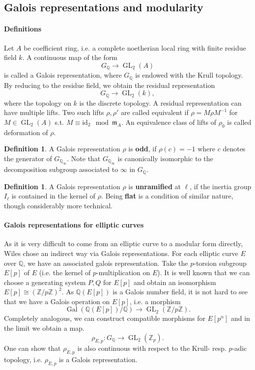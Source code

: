 \documentclass{article}
\theoremstyle{plain}%
\theoremstyle{definition}
\newtheorem{definition}[theorem]{Definition}
\theoremstyle{remark}
\newcommand{\GL}{\operatorname{GL}}
\begin{document}
\subsection{Galois representations and modularity}

\paragraph{Definitions}
Let \(A\) be coefficient ring, i.e. a complete noetherian local ring with finite residue field \(k\).
A continuous map of the form
\[
    G_\mathbb{Q} \to \GL_2(A)
\]
is called a Galois representation, where \(G_\mathbb{Q}\) is endowed with the Krull topology.
By reducing to the residue field, we obtain the residual representation
\[
    G_\mathbb{Q} \to \GL_2(k),
\]
where the topology on \(k\) is the discrete topology.
A residual representation can have multiple lifts. Two such lifts \(\rho, \rho'\) are called equivalent
if \(\rho = M\rho M^{-1}\) for \(M \in \GL_2(A)\) s.t. \(M \equiv \mathrm{id}_{2} \mod \mathfrak{m}_A\).
An equivalence class of lifts of \(\rho_0\) is called deformation of \(\rho\).

\begin{definition}
    A Galois representation \(\rho\) is \textbf{odd}, if \(\rho(c) = -1\) where \(c\) denotes the generator
    of \(G_{\mathbb{Q}_\infty}\). Note that \(G_{\mathbb{Q}_\infty}\) is canonically isomorphic to
    the decomposition subgroup associated to \(\infty\) in \(G_\mathbb{Q}\).
\end{definition}
\begin{definition}
    A Galois representation \(\rho\) is \textbf{unramified} at \(\ell\), if the inertia group
    \(I_\ell\) is contained in the kernel of \(\rho\).
    Being \textbf{flat} is a condition of similar nature, though considerably more technical.
\end{definition}

\paragraph{Galois representations for elliptic curves}
As it is very difficult to come from an elliptic curve to a modular form directly, 
Wiles chose an indirect way via Galois representations.
For each elliptic curve \(E\) over \(\mathbb{Q}\), we have an associated galois representation.
Take the \(p\)-torsion subgroup \(E[p]\) of \(E\) (i.e. the kernel of \(p\)-multiplication on \(E\)).
It is well known that we can choose a generating system \(P, Q\) for \(E[p]\) and 
obtain an isomorphism \(E[p] \cong (\mathbb{Z}/p \mathbb{Z})^2\).
As \(\mathbb{Q}(E[p])\) is a Galois number field, it is not hard to see that we have
a Galois operation on \(E[p]\), i.e. a morphism
\[
    \operatorname{Gal}(\mathbb{Q}(E[p])/\mathbb{Q}) \to \GL_2(\mathbb{Z}/p\mathbb{Z}).  
\]
Completely analogous, we can construct compatible morphisms for \(E[p^n]\) 
and in the limit we obtain a map.
\[
    \rho_{E, p} \colon G_\mathbb{Q} \to \GL_2(\mathbb{Z}_p).
\]
One can show that \(\rho_{E,p}\) is also continuous with respect to the Krull- resp. \(p\)-adic topology,
i.e. \(\rho_{E,p}\) is a Galois representation.
\end{document}
